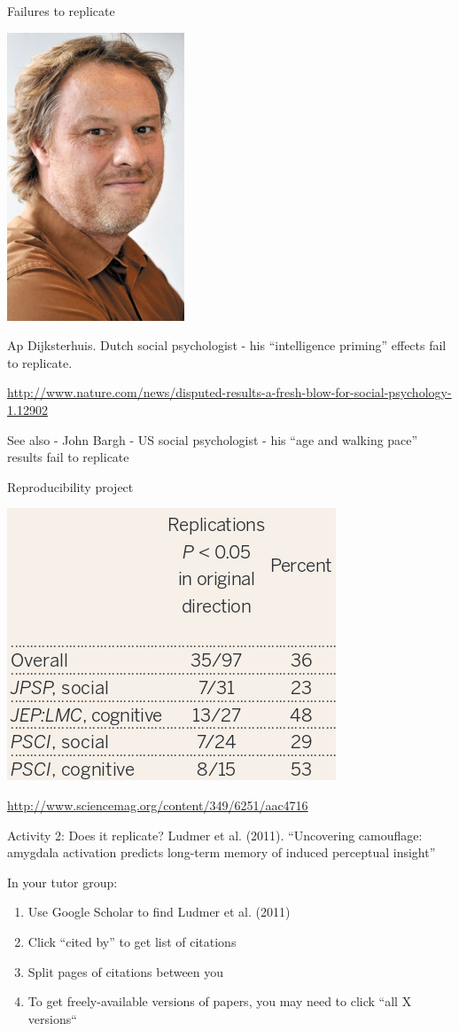 \documentclass{beamer}
\begin{document}
\begin{frame}{Failures to replicate}
	\centerline{\includegraphics[width=.2\textwidth]{pics/ap.jpg}}

	Ap Dijksterhuis. Dutch social psychologist - his ``intelligence priming'' effects fail to replicate. 
	
	\url{http://www.nature.com/news/disputed-results-a-fresh-blow-for-social-psychology-1.12902}
	
	See also - John Bargh - US social psychologist - his ``age and walking pace'' results fail to replicate
	
\end{frame}

\begin{frame}{Reproducibility project}
	\centerline{\includegraphics[width=.8\textwidth]{pics/nosek.png}}
	\url{http://www.sciencemag.org/content/349/6251/aac4716}
\end{frame}

\begin{frame}{Activity 2: Does it replicate?}
  Ludmer et al. (2011). ``Uncovering camouflage: amygdala activation predicts
  long-term memory of induced perceptual insight''

  In your tutor group: 
  \begin{enumerate}
    \item Use Google Scholar to find Ludmer et al. (2011)
    \item Click ``cited by'' to get list of citations
    \item Split pages of citations between you
    \item To get freely-available versions of papers, you may need to click ``all X versions``
    \end{enumerate}

\end{frame}
\end{document}
